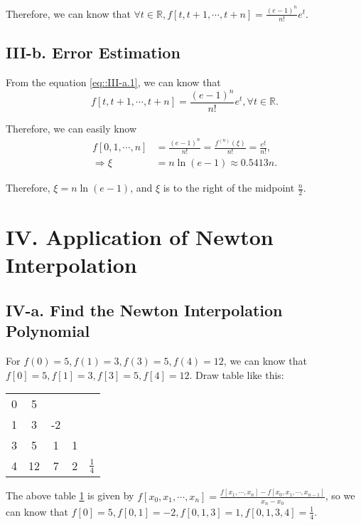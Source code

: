 \documentclass[a4paper]{article}
\begin{document}
Therefore, we can know that $\forall t\in \mathbb{R}, f[t,t+1,\cdots, t+n] = \frac{(e-1)^n}{n!}e^t$. 

\subsection*{III-b. Error Estimation}

From the equation \ref{eq::III-a.1}, we can know that
\begin{equation}
    f[t,t+1,\cdots, t+n] = \frac{(e-1)^n}{n!}e^t, \forall t\in \mathbb{R}. 
\end{equation}

Therefore, we can easily know
\begin{equation}
  \begin{aligned}
    f[0,1,\cdots, n] &= \frac{(e-1)^n}{n!} = \frac{f^{(n)}(\xi)}{n!} = \frac{e^{\xi}}{n!}, \\
    \Rightarrow \xi &= n \ln(e-1) \approx 0.5413n.
  \end{aligned}
\end{equation}

Therefore, $\xi = n \ln(e-1)$, and $\xi$ is to the right of the midpoint $\frac{n}{2}$.

\section*{IV. Application of Newton Interpolation}

\subsection*{IV-a. Find the Newton Interpolation Polynomial}

For $f(0)=5, f(1)=3, f(3)=5, f(4)=12$, we can know that $f[0]=5, f[1]=3, f[3]=5, f[4]=12$. Draw table like this:

\begin{table}[H]
  \centering
  \begin{tabular}{c|cccc}
    0 & 5  &    &   &\\
    1 & 3  & -2 &   &\\
    3 & 5  & 1  & 1 &\\
    4 & 12 & 7  & 2 & $\frac{1}{4}$\\
  \end{tabular}
  \label{tabel::IV-A.tabel1}
\end{table}

The above table \ref{tabel::IV-A.tabel1} is given by $f[x_0,x_1,\cdots,x_n] = \frac{f[x_1,\cdots,x_n] - f[x_0,x_1,\cdots,x_{n-1}]}{x_n - x_0}$, so we can know that $f[0]=5, f[0,1]=-2, f[0,1,3]=1, f[0,1,3,4]=\frac{1}{4}$. 
\end{document}
